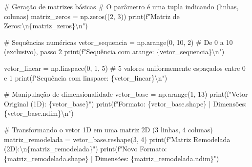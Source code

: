 \documentclass[
  brazilian,
  letterpaper,
  DIV=11,
  numbers=noendperiod]{scrreprt}
\newenvironment{Shaded}{\begin{snugshade}}{\end{snugshade}}
\newcommand{\BuiltInTok}[1]{\textcolor[rgb]{0.00,0.23,0.31}{#1}}
\newcommand{\CharTok}[1]{\textcolor[rgb]{0.13,0.47,0.30}{#1}}
\newcommand{\CommentTok}[1]{\textcolor[rgb]{0.37,0.37,0.37}{#1}}
\newcommand{\DecValTok}[1]{\textcolor[rgb]{0.68,0.00,0.00}{#1}}
\newcommand{\NormalTok}[1]{\textcolor[rgb]{0.00,0.23,0.31}{#1}}
\newcommand{\OperatorTok}[1]{\textcolor[rgb]{0.37,0.37,0.37}{#1}}
\newcommand{\SpecialCharTok}[1]{\textcolor[rgb]{0.37,0.37,0.37}{#1}}
\newcommand{\SpecialStringTok}[1]{\textcolor[rgb]{0.13,0.47,0.30}{#1}}
\begin{document}
\begin{Shaded}
\begin{Highlighting}[]
\CommentTok{\# Geração de matrizes básicas}
\CommentTok{\# O parâmetro é uma tupla indicando (linhas, colunas)}
\NormalTok{matriz\_zeros }\OperatorTok{=}\NormalTok{ np.zeros((}\DecValTok{2}\NormalTok{, }\DecValTok{3}\NormalTok{)) }
\BuiltInTok{print}\NormalTok{(}\SpecialStringTok{f"Matriz de Zeros:}\CharTok{\textbackslash{}n}\SpecialCharTok{\{}\NormalTok{matriz\_zeros}\SpecialCharTok{\}}\CharTok{\textbackslash{}n}\SpecialStringTok{"}\NormalTok{)}

\CommentTok{\# Sequências numéricas}
\NormalTok{vetor\_sequencia }\OperatorTok{=}\NormalTok{ np.arange(}\DecValTok{0}\NormalTok{, }\DecValTok{10}\NormalTok{, }\DecValTok{2}\NormalTok{) }\CommentTok{\# De 0 a 10 (exclusivo), passo 2}
\BuiltInTok{print}\NormalTok{(}\SpecialStringTok{f"Sequência com arange: }\SpecialCharTok{\{}\NormalTok{vetor\_sequencia}\SpecialCharTok{\}}\CharTok{\textbackslash{}n}\SpecialStringTok{"}\NormalTok{)}

\NormalTok{vetor\_linear }\OperatorTok{=}\NormalTok{ np.linspace(}\DecValTok{0}\NormalTok{, }\DecValTok{1}\NormalTok{, }\DecValTok{5}\NormalTok{) }\CommentTok{\# 5 valores uniformemente espaçados entre 0 e 1}
\BuiltInTok{print}\NormalTok{(}\SpecialStringTok{f"Sequência com linspace: }\SpecialCharTok{\{}\NormalTok{vetor\_linear}\SpecialCharTok{\}}\CharTok{\textbackslash{}n}\SpecialStringTok{"}\NormalTok{)}

\CommentTok{\# Manipulação de dimensionalidade}
\NormalTok{vetor\_base }\OperatorTok{=}\NormalTok{ np.arange(}\DecValTok{1}\NormalTok{, }\DecValTok{13}\NormalTok{)}
\BuiltInTok{print}\NormalTok{(}\SpecialStringTok{f"Vetor Original (1D): }\SpecialCharTok{\{}\NormalTok{vetor\_base}\SpecialCharTok{\}}\SpecialStringTok{"}\NormalTok{)}
\BuiltInTok{print}\NormalTok{(}\SpecialStringTok{f"Formato: }\SpecialCharTok{\{}\NormalTok{vetor\_base}\SpecialCharTok{.}\NormalTok{shape}\SpecialCharTok{\}}\SpecialStringTok{ | Dimensões: }\SpecialCharTok{\{}\NormalTok{vetor\_base}\SpecialCharTok{.}\NormalTok{ndim}\SpecialCharTok{\}}\CharTok{\textbackslash{}n}\SpecialStringTok{"}\NormalTok{)}

\CommentTok{\# Transformando o vetor 1D em uma matriz 2D (3 linhas, 4 colunas)}
\NormalTok{matriz\_remodelada }\OperatorTok{=}\NormalTok{ vetor\_base.reshape(}\DecValTok{3}\NormalTok{, }\DecValTok{4}\NormalTok{)}
\BuiltInTok{print}\NormalTok{(}\SpecialStringTok{f"Matriz Remodelada (2D):}\CharTok{\textbackslash{}n}\SpecialCharTok{\{}\NormalTok{matriz\_remodelada}\SpecialCharTok{\}}\SpecialStringTok{"}\NormalTok{)}
\BuiltInTok{print}\NormalTok{(}\SpecialStringTok{f"Novo Formato: }\SpecialCharTok{\{}\NormalTok{matriz\_remodelada}\SpecialCharTok{.}\NormalTok{shape}\SpecialCharTok{\}}\SpecialStringTok{ | Dimensões: }\SpecialCharTok{\{}\NormalTok{matriz\_remodelada}\SpecialCharTok{.}\NormalTok{ndim}\SpecialCharTok{\}}\SpecialStringTok{"}\NormalTok{)}
\end{Highlighting}
\end{Shaded}
\end{document}
